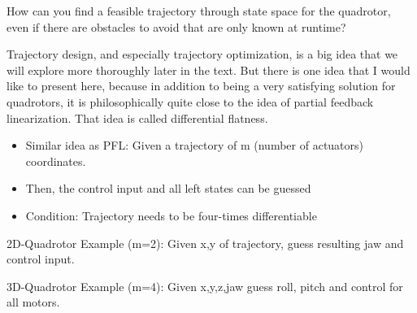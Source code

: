 How can you find a feasible trajectory through state space for the quadrotor, even if there are obstacles to avoid that are only known at runtime? 

Trajectory design, and especially trajectory optimization, is a big idea that we will explore more thoroughly later in the text. But there is one idea that I would like to present here, because in addition to being a very satisfying solution for quadrotors, it is philosophically quite close to the idea of partial feedback linearization. That idea is called differential flatness.

\begin{itemize}
\item Similar idea as PFL: Given a trajectory of m (number of actuators) coordinates. 
\item Then, the control input and all left states can be guessed
\item Condition: Trajectory needs to be four-times differentiable
\end{itemize}

2D-Quadrotor Example (m=2): Given x,y of trajectory, guess resulting jaw and control input.

3D-Quadrotor Example (m=4): Given x,y,z,jaw guess roll, pitch and control for all motors.

